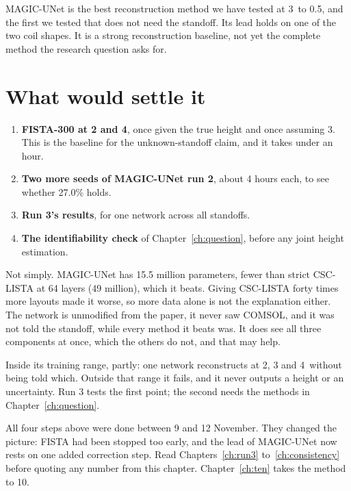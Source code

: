 \begin{keyidea}
MAGIC-UNet is the best reconstruction method we have tested at 3\um\ to 0.5\um, and the first we tested that does not need the
standoff. Its lead holds on one of the two coil shapes. It is a strong reconstruction baseline, not yet the complete method
the research question asks for.
\end{keyidea}

\section{What would settle it}

\begin{enumerate}
\item \textbf{FISTA-300 at 2 and 4\um}, once given the true height and once assuming 3\um. This is the baseline for the
unknown-standoff claim, and it takes under an hour.
\item \textbf{Two more seeds of MAGIC-UNet run 2}, about 4 hours each, to see whether 27.0\% holds.
\item \textbf{Run 3's results}, for one network across all standoffs.
\item \textbf{The identifiability check} of Chapter~\ref{ch:question}, before any joint height estimation.
\end{enumerate}

\begin{defend}
Not simply. MAGIC-UNet has 15.5 million parameters, fewer than strict CSC-LISTA at 64 layers (49 million), which it beats.
Giving CSC-LISTA forty times more layouts made it worse, so more data alone is not the explanation either. The network is
unmodified from the paper, it never saw COMSOL, and it was not told the standoff, while every method it beats was. It does
see all three components at once, which the others do not, and that may help.
\end{defend}

\begin{defend}
Inside its training range, partly: one network reconstructs at 2, 3 and 4\um\ without being told which. Outside that range
it fails, and it never outputs a height or an uncertainty. Run 3 tests the first point; the second needs the methods in
Chapter~\ref{ch:question}.
\end{defend}

\begin{careful}
All four steps above were done between 9 and 12 November. They changed the picture: FISTA had been stopped too early,
and the lead of MAGIC-UNet now rests on one added correction step. Read Chapters~\ref{ch:run3} to~\ref{ch:consistency} before
quoting any number from this chapter. Chapter~\ref{ch:ten} takes the method to 10\um.
\end{careful}

